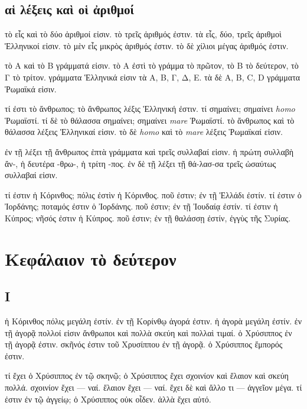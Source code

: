 \documentclass[a4paper]{report}
\begin{document}
\subsection{αἱ λέξεις καὶ οἱ
ἀριθμοί}\label{ux3b1ux1f31-ux3bbux3adux3beux3b5ux3b9ux3c2-ux3baux3b1ux1f76-ux3bfux1f31-ux1f00ux3c1ux3b9ux3b8ux3bcux3bfux3af}

τὸ εἷς καὶ τὸ δύο ἀριθμοί εἰσιν. τὸ τρεῖς ἀριθμός ἐστιν. τὰ εἷς, δύο,
τρεῖς ἀριθμοὶ Ἑλληνικοί εἰσιν. τὸ μὲν εἷς μικρὸς ἀριθμός ἐστιν. τὸ δὲ
χίλιοι μέγας ἀριθμός ἐστιν.

τὸ Α καὶ τὸ Β γράμματά εἰσιν. τὸ Α ἐστὶ τὸ γράμμα τὸ πρῶτον, τὸ Β τὸ
δεύτερον, τὸ Γ τὸ τρίτον. γράμματα Ἑλληνικά εἰσιν τὰ Α, Β, Γ, Δ, Ε. τὰ
δὲ A, B, C, D γράμματα Ῥωμαϊκά εἰσιν.

τί ἐστι τὸ ἄνθρωπος; τὸ ἄνθρωπος λέξις Ἑλληνική ἐστιν. τί σημαίνει;
σημαίνει \emph{homo} Ῥωμαϊστί. τί δὲ τὸ θάλασσα σημαίνει; σημαίνει
\emph{mare} Ῥωμαϊστί. τὸ ἄνθρωπος καὶ τὸ θάλασσα λέξεις Ἑλληνικαί εἰσιν.
τὸ δὲ \emph{homo} καὶ τὸ \emph{mare} λέξεις Ῥωμαϊκαί εἰσιν.

ἐν τῇ λέξει τῇ ἄνθρωπος ἑπτὰ γράμματα καὶ τρεῖς συλλαβαί εἰσιν. ἡ πρώτη
συλλαβὴ ἄν-, ἡ δευτέρα -θρω-, ἡ τρίτη -πος. ἐν δὲ τῇ λέξει τῇ θά-λασ-σα
τρεῖς ὡσαύτως συλλαβαί εἰσιν.

τί ἐστιν ἡ Κόρινθος; πόλις ἐστὶν ἡ Κόρινθος. ποῦ ἐστιν; ἐν τῇ Ἑλλάδι
ἐστίν. τί ἐστιν ὁ Ἰορδάνης; ποταμός ἐστιν ὁ Ἰορδάνης. ποῦ ἐστιν; ἐν τῇ
Ἰουδαίᾳ ἐστίν. τί ἐστιν ἡ Κύπρος; νῆσός ἐστιν ἡ Κύπρος. ποῦ ἐστιν; ἐν τῇ
θαλάσσῃ ἐστίν, ἐγγὺς τῆς Συρίας.

\section{Κεφάλαιον τὸ
δεύτερον}\label{ux3baux3b5ux3c6ux3acux3bbux3b1ux3b9ux3bfux3bd-ux3c4ux1f78-ux3b4ux3b5ux3cdux3c4ux3b5ux3c1ux3bfux3bd}

\subsection{Ι}\label{ux3b9-1}

ἡ Κόρινθος πόλις μεγάλη ἐστίν. ἐν τῇ Κορίνθῳ ἀγορά ἐστιν. ἡ ἀγορὰ μεγάλη
ἐστίν. ἐν τῇ ἀγορᾷ πολλοί εἰσιν ἄνθρωποι καὶ πολλὰ σκεύη καὶ πολλαὶ
τιμαί. ὁ Χρύσιππος ἐν τῇ ἀγορᾷ ἐστιν. σκῆνός ἐστιν τοῦ Χρυσίππου ἐν τῇ
ἀγορᾷ. ὁ Χρύσιππος ἔμπορός ἐστιν.

τί ἔχει ὁ Χρύσιππος ἐν τῷ σκηνῷ; ὁ Χρύσιππος ἔχει σχοινίον καὶ ἔλαιον
καὶ σκεύη πολλά. σχοινίον ἔχει --- ναί. ἔλαιον ἔχει --- ναί. ἔχει δὲ καὶ
ἄλλο τι --- ἀγγεῖον μέγα. τί ἐστιν ἐν τῷ ἀγγείῳ; ὁ Χρύσιππος οὐκ οἶδεν.
ἀλλὰ ἔχει αὐτό.
\end{document}
